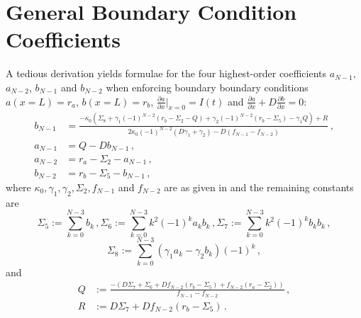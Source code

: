 \documentclass{prettytex/ox/mmsc-special-topic}
\begin{document}
  \section{General Boundary Condition Coefficients}
  \label{sec:general-case}
  A tedious derivation yields formulae for the four highest-order coefficients $a_{N-1}$, $a_{N-2}$, $b_{N-1}$ and $b_{N-2}$ when enforcing boundary boundary conditions $a(x=L) = r_a$, $b(x=L) = r_b$, $\frac{\partial a}{\partial x}\big|_{x=0} = I(t)$ and $\frac{\partial a}{\partial x} + D \frac{\partial b}{\partial x} = 0$:
  \begin{align*}
    b_{N-1} & = \frac{-\kappa_0 \left(\Sigma_8 + \gamma_1 (-1)^{N-2}(r_b - \Sigma_2 - Q) + \gamma_2 (-1)^{N-2} (r_b - \Sigma_5) - \gamma_1 Q\right) + R}{2 \kappa_0 (-1)^{N-2} (D \gamma_1 + \gamma_2) - D (f_{N-1} - f_{N-2})}\,, \\
    a_{N-1} & = Q - D b_{N-1}\,,                                                                                                                                                                                                   \\
    a_{N-2} & = r_a - \Sigma_2 - a_{N-1}\,,                                                                                                                                                                                        \\
    b_{N-2} & = r_b - \Sigma_5 - b_{N-1}\,,
  \end{align*}
  where $\kappa_0, \gamma_1, \gamma_2, \Sigma_2, f_{N-1}$ and $f_{N-2}$ are as given in  and the remaining constants are
  $$\Sigma_5 := \sum_{k=0}^{N-3} b_k\,,
    \Sigma_6 := \sum_{k=0}^{N-3} k^2 (-1)^k a_k b_k\,,
    \Sigma_7 := \sum_{k=0}^{N-3} k^2 (-1)^k b_k b_k\,,$$
  $$\Sigma_8 := \sum_{k=0}^{N-3} (\gamma_1 a_k - \gamma_2 b_k)(-1)^k\,,$$
  and
  \begin{align*}
    Q & := \frac{-\left(D \Sigma_7 + \Sigma_6 + D f_{N-2} (r_b - \Sigma_5) + f_{N-2} (r_a - \Sigma_2)\right)}{f_{N-1} - f_{N-2}}\,, \\
    R & := D \Sigma_7 + D f_{N-2} (r_b - \Sigma_5)\,.
  \end{align*}
\end{document}
